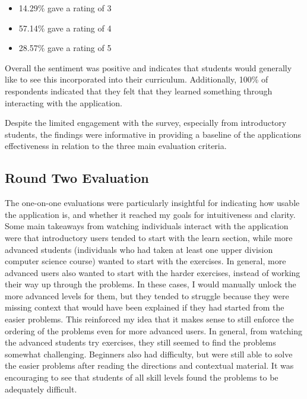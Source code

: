 \documentclass[10pt,twocolumn]{article}
\begin{document}
\begin{itemize}
    \item 14.29\% gave a rating of 3
    \item 57.14\% gave a rating of 4
    \item 28.57\% gave a rating of 5
\end{itemize}

Overall the sentiment was positive and indicates that students would generally like to see this incorporated into their 
curriculum. Additionally, 100\% of respondents indicated that they felt that they learned something through interacting 
with the application. 

Despite the limited engagement with the survey, especially from introductory students, the findings were informative in 
providing a baseline of the applications effectiveness in relation to the three main evaluation criteria.

\subsection{Round Two Evaluation}

The one-on-one evaluations were particularly insightful for indicating how usable the application is, and whether it 
reached my goals for intuitiveness and clarity. Some main takeaways from watching individuals interact with the application 
were that introductory users tended to start with the learn section, while more advanced students (individuals who had 
taken at least one upper division computer science course) wanted to start with the exercises. In general, more advanced 
users also wanted to start with the harder exercises, instead of working their way up through the problems. In these 
cases, I would manually unlock the more advanced levels for them, but they tended to struggle because they were missing 
context that would have been explained if they had started from the easier problems. This reinforced my idea that it makes 
sense to still enforce the ordering of the problems even for more advanced users. In general, from watching the advanced 
students try exercises, they still seemed to find the problems somewhat challenging. Beginners also had difficulty, but 
were still able to solve the easier problems after reading the directions and contextual material. It was encouraging to 
see that students of all skill levels found the problems to be adequately difficult.
\end{document}
